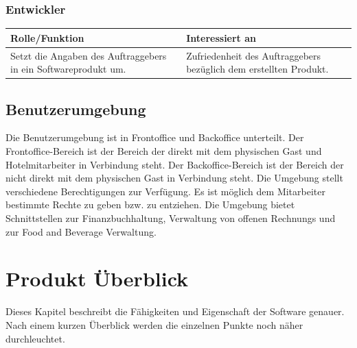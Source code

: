 \documentclass[10pt,a4paper,titlepage]{article}
\begin{document}
\subsubsection{Entwickler}
\begin{tabular}[t]{|p{5cm}|p{5cm}|}
    \hline
    \textbf{Rolle\slash{}Funktion} & \textbf{Interessiert an} \\
    \hline
Setzt die Angaben des Auftraggebers in ein Softwareprodukt um. &
	Zufriedenheit des Auftraggebers bezüglich dem erstellten Produkt.\\
    \hline
\end{tabular}
\subsection{Benutzerumgebung}
Die Benutzerumgebung ist in \Gls{Frontoffice} und \Gls{Backoffice} unterteilt. Der \Gls{Frontoffice}-Bereich ist der Bereich der direkt mit dem physischen \Gls{Gast} und Hotelmitarbeiter in Verbindung steht. Der \Gls{Backoffice}-Bereich ist der Bereich der nicht direkt mit dem physischen \Gls{Gast} in Verbindung steht. Die Umgebung stellt verschiedene Berechtigungen zur Verfügung. Es ist möglich dem \Gls{Mitarbeiter} bestimmte Rechte zu geben bzw. zu entziehen. Die Umgebung bietet Schnittstellen zur Finanzbuchhaltung, Verwaltung von offenen \Glspl{Rechnung} und zur Food and Beverage Verwaltung.

\newpage

\section{Produkt Überblick}
Dieses Kapitel beschreibt die Fähigkeiten und Eigenschaft der Software genauer. Nach einem kurzen Überblick werden die einzelnen Punkte noch näher durchleuchtet.
\end{document}
